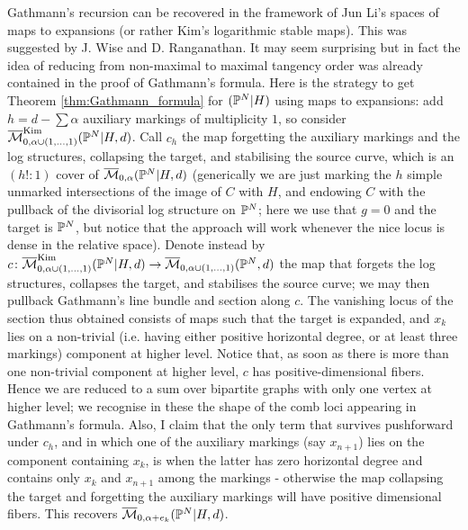\begin{rmk}\label{rmk:expandedGathmann}
 Gathmann's recursion can be recovered in the framework of Jun Li's spaces of maps to expansions (or rather Kim's logarithmic stable maps). This was suggested by J. Wise and D. Ranganathan. It may seem surprising but in fact the idea of reducing from non-maximal to maximal tangency order was already contained in the proof of Gathmann's formula. Here is the strategy to get Theorem \ref{thm:Gathmann_formula} for $(\mathbb P^N|H)$ using maps to expansions: add $h=d-\sum\alpha$ auxiliary markings of multiplicity $1$, so consider $\overline{\mathcal{M}}^{\rm{Kim}}_{0,\alpha\cup(1,\ldots,1)}(\mathbb P^N|H,d)$. Call $c_h$ the map forgetting the auxiliary markings and the log structures, collapsing the target, and stabilising the source curve, which is an $(h!:1)$ cover of $\overline{\mathcal{M}}_{0,\alpha}(\mathbb P^N|H,d)$ (generically we are just marking the $h$ simple unmarked intersections of the image of $C$ with $H$, and endowing $C$ with the pullback of the divisorial log structure on $\mathbb P^N$; here we use that $g=0$ and the target is $\mathbb P^N$, but notice that the approach will work whenever the nice locus is dense in the relative space). Denote instead by $c\colon \overline{\mathcal{M}}^{\rm{Kim}}_{0,\alpha\cup(1,\ldots,1)}(\mathbb P^N|H,d)\rightarrow \overline{\mathcal{M}}_{0,\alpha\cup(1,\ldots,1)}(\mathbb P^N,d)$ the map that forgets the log structures, collapses the target, and stabilises the source curve; we may then pullback Gathmann's line bundle and section along $c$. The vanishing locus of the section thus obtained consists of maps such that the target is expanded, and $x_k$ lies on a non-trivial (i.e. having either positive horizontal degree, or at least three markings) component at higher level. Notice that, as soon as there is more than one non-trivial component at higher level, $c$ has positive-dimensional fibers. Hence we are reduced to a sum over bipartite graphs with only one vertex at higher level; we recognise in these the shape of the comb loci appearing in Gathmann's formula. Also, I claim that the only term that survives pushforward under $c_h$, and in which one of the auxiliary markings (say $x_{n+1}$) lies on the component containing $x_k$, is when the latter has zero horizontal degree and contains only $x_k$ and $x_{n+1}$ among the markings - otherwise the map collapsing the target and forgetting the auxiliary markings will have positive dimensional fibers. This recovers $\overline{\mathcal{M}}_{0,\alpha+e_k}(\mathbb P^N|H,d)$. 
 \begin{center}
\end{center}
 

\end{rmk}
